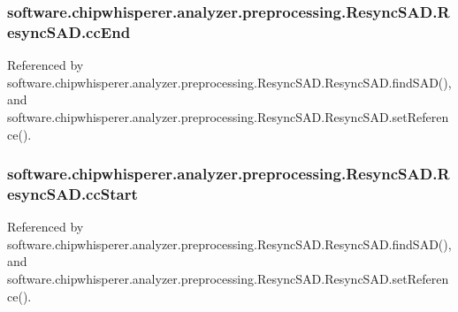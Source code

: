 \subsubsection[{cc\+End}]{\setlength{\rightskip}{0pt plus 5cm}software.\+chipwhisperer.\+analyzer.\+preprocessing.\+Resync\+S\+A\+D.\+Resync\+S\+A\+D.\+cc\+End}\label{classsoftware_1_1chipwhisperer_1_1analyzer_1_1preprocessing_1_1ResyncSAD_1_1ResyncSAD_a7021d2e186d7f80e84eebc97f9496e17}


Referenced by software.\+chipwhisperer.\+analyzer.\+preprocessing.\+Resync\+S\+A\+D.\+Resync\+S\+A\+D.\+find\+S\+A\+D(), and software.\+chipwhisperer.\+analyzer.\+preprocessing.\+Resync\+S\+A\+D.\+Resync\+S\+A\+D.\+set\+Reference().

\hypertarget{classsoftware_1_1chipwhisperer_1_1analyzer_1_1preprocessing_1_1ResyncSAD_1_1ResyncSAD_a8b347ff4d8d8024df60ee126853dd4f3}{}
\subsubsection[{cc\+Start}]{\setlength{\rightskip}{0pt plus 5cm}software.\+chipwhisperer.\+analyzer.\+preprocessing.\+Resync\+S\+A\+D.\+Resync\+S\+A\+D.\+cc\+Start}\label{classsoftware_1_1chipwhisperer_1_1analyzer_1_1preprocessing_1_1ResyncSAD_1_1ResyncSAD_a8b347ff4d8d8024df60ee126853dd4f3}


Referenced by software.\+chipwhisperer.\+analyzer.\+preprocessing.\+Resync\+S\+A\+D.\+Resync\+S\+A\+D.\+find\+S\+A\+D(), and software.\+chipwhisperer.\+analyzer.\+preprocessing.\+Resync\+S\+A\+D.\+Resync\+S\+A\+D.\+set\+Reference().

\hypertarget{classsoftware_1_1chipwhisperer_1_1analyzer_1_1preprocessing_1_1ResyncSAD_1_1ResyncSAD_aa6447e8584b1a84a6b2ad2923e18cc1c}{}
